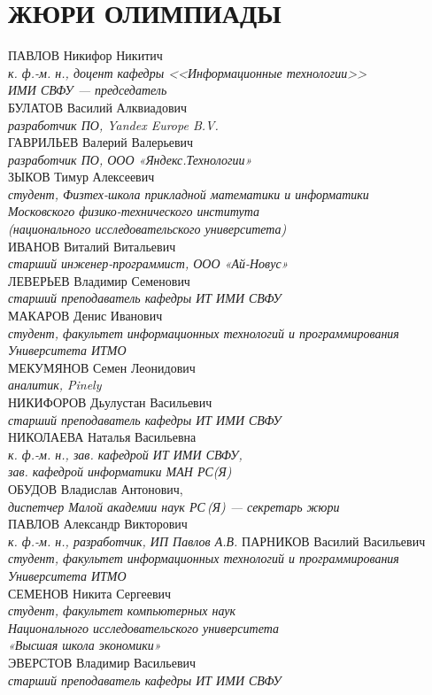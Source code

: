 \section[Жюри]{ЖЮРИ ОЛИМПИАДЫ}
\thispagestyle{plain}

ПАВЛОВ Никифор Никитич \\
\textit{к. ф.-м. н., доцент кафедры <<Информационные технологии>>\\ ИМИ СВФУ --- председатель}
\\[2mm]
БУЛАТОВ Василий Алквиадович\\
\textit{разработчик ПО, Yandex Europe B.V.}
\\[2mm]
ГАВРИЛЬЕВ Валерий Валерьевич\\
\textit{разработчик ПО, ООО «Яндекс.Технологии»}
\\[2mm]
ЗЫКОВ Тимур Алексеевич\\ 
\textit{студент, Физтех-школа прикладной математики и информатики \\
Московского физико-технического института \\
(национального исследовательского университета)}
\\[2mm]
ИВАНОВ Виталий Витальевич\\
\textit{старший инженер-программист, ООО «Ай-Новус»}
\\[2mm]
ЛЕВЕРЬЕВ Владимир Семенович \\
\textit{старший преподаватель кафедры ИТ ИМИ СВФУ}
\\[2mm]
МАКАРОВ Денис Иванович\\
\textit{студент, факультет информационных технологий и программирования Университета ИТМО}
\\[2mm]
МЕКУМЯНОВ Семен Леонидович\\
\textit{аналитик, Pinely}
\\[2mm]
НИКИФОРОВ Дьулустан Васильевич \\
\textit{старший преподаватель кафедры ИТ ИМИ СВФУ}
\\[2mm]
НИКОЛАЕВА Наталья Васильевна \\
\textit{к. ф.-м. н., зав. кафедрой ИТ ИМИ СВФУ,\\
зав. кафедрой информатики МАН РС(Я)}
\\[2mm]
ОБУДОВ Владислав Антонович, \\
\textit{диспетчер  Малой академии наук РС\,(Я) --- секретарь жюри}
\\[2mm]
ПАВЛОВ Александр Викторович \\
\textit{к. ф.-м. н., разработчик, ИП Павлов А.В.}
\newpage\noindent
ПАРНИКОВ Василий Васильевич\\
\textit{студент, факультет информационных технологий и программирования Университета ИТМО}
\\[2mm]
СЕМЕНОВ Никита Сергеевич\\
\textit{студент, факультет компьютерных наук \\
Национального исследовательского университета \\
«Высшая школа экономики»}
\\[2mm]
ЭВЕРСТОВ Владимир Васильевич \\
\textit{старший преподаватель кафедры ИТ ИМИ СВФУ}
